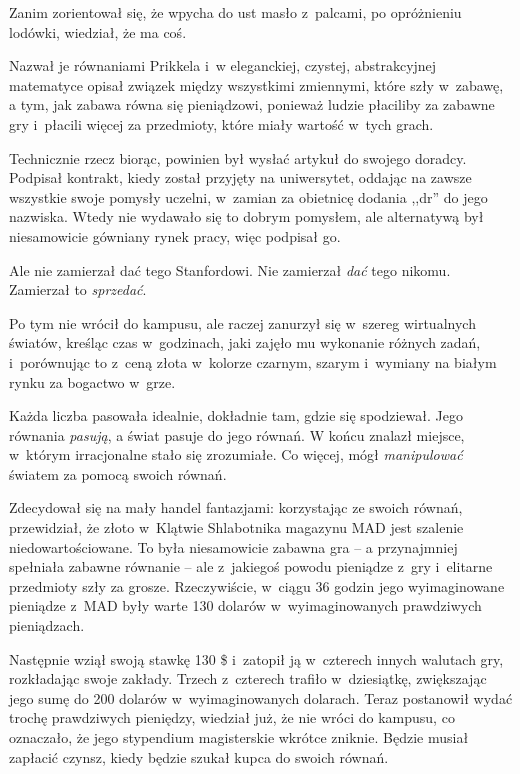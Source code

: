 \documentclass[oneside,polish,11pt,rmheadings]{mwbk}
\begin{document}
Zanim zorientował się, że wpycha do ust masło z~palcami, po opróżnieniu lodówki, wiedział, że ma coś.

Nazwał je równaniami Prikkela i~w eleganckiej, czystej, abstrakcyjnej matematyce opisał związek między wszystkimi zmiennymi, które szły w~zabawę, a tym, jak zabawa równa się pieniądzowi, ponieważ ludzie płaciliby za zabawne gry i~płacili więcej za przedmioty, które miały wartość w~tych grach.

Technicznie rzecz biorąc, powinien był wysłać artykuł do swojego doradcy. Podpisał kontrakt, kiedy został przyjęty na uniwersytet, oddając na zawsze wszystkie swoje pomysły uczelni, w~zamian za obietnicę dodania ,,dr'' do jego nazwiska. Wtedy nie wydawało się to dobrym pomysłem, ale alternatywą był niesamowicie gówniany rynek pracy, więc podpisał go.

Ale nie zamierzał dać tego Stanfordowi. Nie zamierzał \textit{dać }tego nikomu. Zamierzał to \textit{sprzedać}.

Po tym nie wrócił do kampusu, ale raczej zanurzył się w~szereg wirtualnych światów, kreśląc czas w~godzinach, jaki zajęło mu wykonanie różnych zadań, i~porównując to z~ceną złota w~kolorze czarnym, szarym i~wymiany na białym rynku za bogactwo w~grze.

Każda liczba pasowała idealnie, dokładnie tam, gdzie się spodziewał. Jego równania \textit{pasują}, a świat pasuje do jego równań. W końcu znalazł miejsce, w~którym irracjonalne stało się zrozumiałe. Co więcej, mógł \textit{manipulować }światem za pomocą swoich równań.

Zdecydował się na mały handel fantazjami: korzystając ze swoich równań, przewidział, że złoto w~Klątwie Shlabotnika magazynu MAD jest szalenie niedowartościowane. To była niesamowicie zabawna gra -- a przynajmniej spełniała zabawne równanie -- ale z~jakiegoś powodu pieniądze z~gry i~elitarne przedmioty szły za grosze. Rzeczywiście, w~ciągu 36 godzin jego wyimaginowane pieniądze z~MAD były warte 130 dolarów w~wyimaginowanych prawdziwych pieniądzach.

Następnie wziął swoją stawkę 130 \$ i~zatopił ją w~czterech innych walutach gry, rozkładając swoje zakłady. Trzech z~czterech trafiło w~dziesiątkę, zwiększając jego sumę do 200 dolarów w~wyimaginowanych dolarach. Teraz postanowił wydać trochę prawdziwych pieniędzy, wiedział już, że nie wróci do kampusu, co oznaczało, że jego stypendium magisterskie wkrótce zniknie. Będzie musiał zapłacić czynsz, kiedy będzie szukał kupca do swoich równań.
\end{document}
